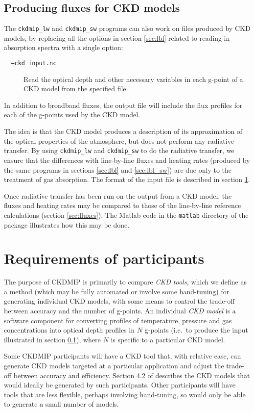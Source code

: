 \documentclass[twoside]{article}
\def\codesize{\small}
\def\code#1{{\codesize\texttt{#1}}}
\def\citem#1{\item[{\codesize\texttt{#1}}]}
\begin{document}
\subsection{Producing fluxes for CKD models}
\label{sec:ckd}
The \code{ckdmip\_lw} and \code{ckdmip\_sw} programs can also work on
files produced by CKD models, by replacing all the options in section
\ref{sec:lbl} related to reading in absorption spectra with a single
option:
%
\begin{description}
\citem{~~--ckd input.nc} Read the optical depth and other necessary
variables in each g-point of a CKD model from the specified file.
\end{description}
%
In addition to broadband fluxes, the output file will include the flux
profiles for each of the g-points used by the CKD model.

The idea is that the CKD model produces a description of its
approximation of the optical properties of the atmosphere, but does
not perform any radiative transfer.  By using \code{ckdmip\_lw} and
\code{ckdmip\_sw} to do the radiative transfer, we ensure that the
differences with line-by-line fluxes and heating rates (produced by
the same programs in sections \ref{sec:lbl} and \ref{sec:lbl_sw}) are
due only to the treatment of gas absorption. The format of the input
file is described in section \ref{sec:requirements}.

Once radiative transfer has been run on the output from a CKD model,
the fluxes and heating rates may be compared to those of the
line-by-line reference calculations (section \ref{sec:fluxes}).  The
Matlab code in the \code{matlab} directory of the package illustrates
how this may be done.

\section{Requirements of participants}
\label{sec:requirements}
The purpose of CKDMIP is primarily to compare \emph{CKD tools,} which
we define as a method (which may be fully automated or involve some
hand-tuning) for generating individual CKD models, with some means to
control the trade-off between accuracy and the number of g-points. An
individual \emph{CKD model} is a software component for converting
profiles of temperature, pressure and gas concentrations into optical
depth profiles in $N$ g-points (i.e.\ to produce the input illustrated
in section \ref{sec:ckd}), where $N$ is specific to a particular CKD
model.

Some CKDMIP participants will have a CKD tool that, with relative
ease, can generate CKD models targeted at a particular application
and adjust the trade-off between accuracy and efficiency. Section 4.2
of \cite{Hogan+2020} describes the CKD models that would ideally be
generated by such participants.  Other participants will have tools
that are less flexible, perhaps involving hand-tuning, so would only
be able to generate a small number of models.
\end{document}
